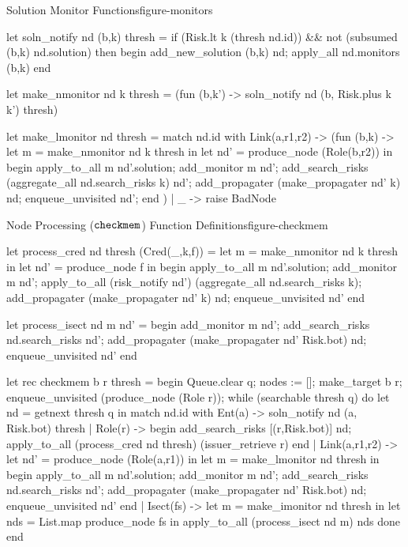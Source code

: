 \begin{fpfig*}[t]{Solution Monitor Functions}{figure-monitors}
\footnotesize
\medskip
\begin{verbatimtab}
  let soln_notify nd (b,k) thresh = 
    if (Risk.lt k (thresh nd.id)) && not (subsumed (b,k) nd.solution)
    then
      begin
        add_new_solution (b,k) nd;
        apply_all nd.monitors (b,k)
      end
        
  let make_nmonitor nd k thresh = 
    (fun (b,k') -> soln_notify nd (b, Risk.plus k k') thresh)
  
  let make_lmonitor nd thresh =
    match nd.id with
      Link(a,r1,r2) -> 
        (fun (b,k) -> 
  	  let m = make_nmonitor nd k thresh in
    	  let nd' = produce_node (Role(b,r2)) in
            begin
  	      apply_to_all m nd'.solution;
  	      add_monitor m nd';
  	      add_search_risks (aggregate_all nd.search_risks k) nd';
  	      add_propagater (make_propagater nd' k) nd;
  	      enqueue_unvisited nd';
  	   end
        )	   
    | _ -> raise BadNode
\end{verbatimtab}
\smallskip
\end{fpfig*}

\begin{fpfig*}{Node Processing ($\texttt{checkmem}$) Function Definitions}{figure-checkmem}
\footnotesize
\medskip
\begin{verbatimtab}
  let process_cred nd thresh (Cred(_,k,f)) = 
    let m = make_nmonitor nd k thresh in 
    let nd' = produce_node f in 
    begin
      apply_to_all m nd'.solution;
      add_monitor m nd';
      apply_to_all (risk_notify nd') (aggregate_all nd.search_risks k);
      add_propagater (make_propagater nd' k) nd;
      enqueue_unvisited nd'
    end
  
  let process_isect nd m nd' = 
    begin
      add_monitor m nd';
      add_search_risks nd.search_risks nd';
      add_propagater (make_propagater nd' Risk.bot) nd;
      enqueue_unvisited nd'
    end

  let rec checkmem b r thresh = 
    begin
      Queue.clear q;
      nodes := [];
      make_target b r;
      enqueue_unvisited (produce_node (Role r));
      while (searchable thresh q) do
        let nd = getnext thresh q in 
        match nd.id with 
  	  Ent(a) -> soln_notify nd (a, Risk.bot) thresh
        | Role(r) -> 
  	    begin
  	      add_search_risks [(r,Risk.bot)] nd;
  	      apply_to_all (process_cred nd thresh) (issuer_retrieve r)
  	    end
        | Link(a,r1,r2) -> 
  	    let nd' = produce_node (Role(a,r1)) in 
  	    let m = make_lmonitor nd thresh in
  	    begin
  	      apply_to_all m nd'.solution;
  	      add_monitor m nd';
  	      add_search_risks nd.search_risks nd';
  	      add_propagater (make_propagater nd' Risk.bot) nd;
  	      enqueue_unvisited nd'
  	    end	      
        | Isect(fs) -> 
  	    let m = make_imonitor nd thresh in
  	    let nds = List.map produce_node fs in
  	    apply_to_all (process_isect nd m) nds
      done
    end
\end{verbatimtab}
\smallskip
\end{fpfig*}

